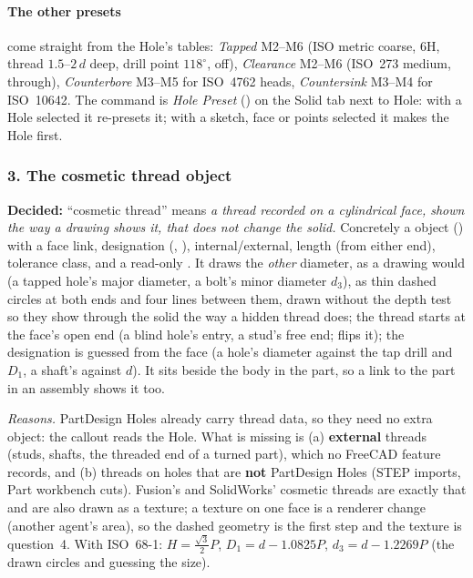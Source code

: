 \paragraph{The other presets} come straight from the Hole's tables: \emph{Tapped} M2--M6 (ISO metric coarse,
6H, thread $1.5$--$2\,d$ deep, drill point $118^\circ$,  off), \emph{Clearance} M2--M6
(ISO~273 medium, through), \emph{Counterbore} M3--M5 for ISO~4762 heads, \emph{Countersink} M3--M4 for
ISO~10642. The command is \emph{Hole Preset} () on the Solid tab next to Hole:
with a Hole selected it re-presets it; with a sketch, face or points selected it makes the Hole first.

\subsubsection*{3. The cosmetic thread object}

\textbf{Decided:} ``cosmetic thread'' means \emph{a thread recorded on a cylindrical face, shown the way a
drawing shows it, that does not change the solid.} Concretely a  object
() with a face link, designation (, ), internal/external,
length (from either end), tolerance class, and a read-only . It draws the \emph{other}
diameter, as a drawing would (a tapped hole's major diameter, a bolt's minor diameter $d_3$), as thin dashed
circles at both ends and four lines between them, drawn without the depth test so they show through the
solid the way a hidden thread does; the thread starts at the face's open end (a blind hole's entry, a
stud's free end;  flips it); the designation is guessed from the face (a hole's
diameter against the tap drill and $D_1$, a shaft's against $d$). It sits beside the body in the part, so
a link to the part in an assembly shows it too.

\emph{Reasons.} PartDesign Holes already carry thread data, so they need no extra object: the callout reads
the Hole. What is missing is (a) \textbf{external} threads (studs, shafts, the threaded end of a turned part),
which no FreeCAD feature records, and (b) threads on holes that are \textbf{not} PartDesign Holes (STEP
imports, Part workbench cuts). Fusion's and SolidWorks' cosmetic threads are exactly that and are also drawn
as a texture; a texture on one face is a renderer change (another agent's area), so the dashed geometry
is the first step and the texture is question~4. With ISO~68-1: $H=\tfrac{\sqrt3}{2}P$,
$D_1=d-1.0825P$, $d_3=d-1.2269P$ (the drawn circles and
guessing the size).

